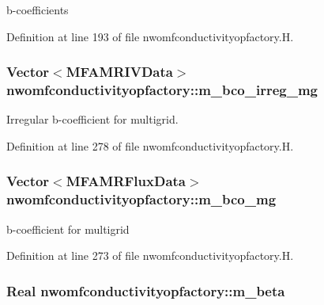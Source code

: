b-\/coefficients 



Definition at line 193 of file nwomfconductivityopfactory.\+H.

\subsubsection[{\texorpdfstring{m\+\_\+bco\+\_\+irreg\+\_\+mg}{m_bco_irreg_mg}}]{\setlength{\rightskip}{0pt plus 5cm}Vector$<${\bf M\+F\+A\+M\+R\+I\+V\+Data}$>$ nwomfconductivityopfactory\+::m\+\_\+bco\+\_\+irreg\+\_\+mg\hspace{0.3cm}{\ttfamily [protected]}}\hypertarget{classnwomfconductivityopfactory_a4309c469bde096c912c2253bfc7afbff}{}\label{classnwomfconductivityopfactory_a4309c469bde096c912c2253bfc7afbff}


Irregular b-\/coefficient for multigrid. 



Definition at line 278 of file nwomfconductivityopfactory.\+H.

\subsubsection[{\texorpdfstring{m\+\_\+bco\+\_\+mg}{m_bco_mg}}]{\setlength{\rightskip}{0pt plus 5cm}Vector$<${\bf M\+F\+A\+M\+R\+Flux\+Data}$>$ nwomfconductivityopfactory\+::m\+\_\+bco\+\_\+mg\hspace{0.3cm}{\ttfamily [protected]}}\hypertarget{classnwomfconductivityopfactory_a97b4687e104c912f489dbb413da863b0}{}\label{classnwomfconductivityopfactory_a97b4687e104c912f489dbb413da863b0}


b-\/coefficient for multigrid 



Definition at line 273 of file nwomfconductivityopfactory.\+H.

\subsubsection[{\texorpdfstring{m\+\_\+beta}{m_beta}}]{\setlength{\rightskip}{0pt plus 5cm}Real nwomfconductivityopfactory\+::m\+\_\+beta\hspace{0.3cm}{\ttfamily [protected]}}\hypertarget{classnwomfconductivityopfactory_ac4fbeb38df8f0519bd319d0eed706c28}{}\label{classnwomfconductivityopfactory_ac4fbeb38df8f0519bd319d0eed706c28}


